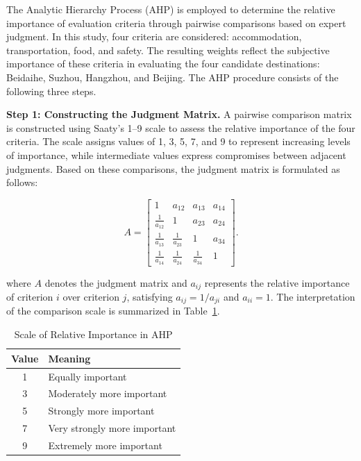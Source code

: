 \documentclass{mcmthesis}
\begin{document}
The Analytic Hierarchy Process (AHP) is employed to determine the relative importance of evaluation criteria through pairwise comparisons based on expert judgment. In this study, four criteria are considered: accommodation, transportation, food, and safety. The resulting weights reflect the subjective importance of these criteria in evaluating the four candidate destinations: Beidaihe, Suzhou, Hangzhou, and Beijing. The AHP procedure consists of the following three steps.

\noindent\textbf{Step 1: Constructing the Judgment Matrix.}
A pairwise comparison matrix is constructed using Saaty's 1--9 scale to assess the relative importance of the four criteria. The scale assigns values of 1, 3, 5, 7, and 9 to represent increasing levels of importance, while intermediate values express compromises between adjacent judgments. Based on these comparisons, the judgment matrix is formulated as follows:

\begin{equation}
A =
\begin{bmatrix}
1 & a_{12} & a_{13} & a_{14} \\
\frac{1}{a_{12}} & 1 & a_{23} & a_{24} \\
\frac{1}{a_{13}} & \frac{1}{a_{23}} & 1 & a_{34} \\
\frac{1}{a_{14}} & \frac{1}{a_{24}} & \frac{1}{a_{34}} & 1
\end{bmatrix}.
\end{equation}

where $A$ denotes the judgment matrix and $a_{ij}$ represents the relative importance of criterion $i$ over criterion $j$, satisfying $a_{ij}=1/a_{ji}$ and $a_{ii}=1$. The interpretation of the comparison scale is summarized in Table~\ref{tab:ahp_scale}.

\begin{table}[htbp]
\centering
\caption{Scale of Relative Importance in AHP}
\label{tab:ahp_scale}
\begin{tabular}{cl}
\hline
\textbf{Value} & \textbf{Meaning} \\
\hline
1 & Equally important \\
3 & Moderately more important \\
5 & Strongly more important \\
7 & Very strongly more important \\
9 & Extremely more important \\
\hline
\end{tabular}
\end{table}
\end{document}
